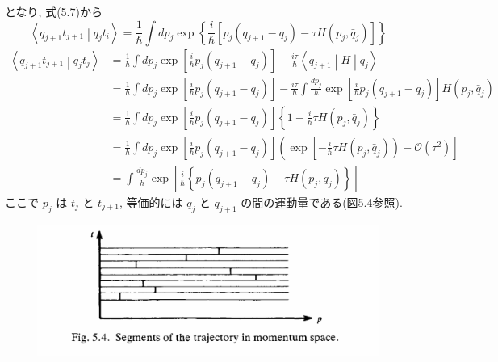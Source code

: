 \documentclass[a4paper,12pt]{article}
\newcommand{\braket}[2]{\left\langle #1\middle|#2\right\rangle}
\newcommand{\brakets}[3]{\left\langle #1\middle| #2 \middle|#3 \right\rangle}
\begin{document}
となり, 式(5.7)から
\begin{equation*}
    \braket{q_{j+1}t_{j+1}}{q_{j}t_{i}} = \frac{1}{\hbar}\int dp_{j} \exp\left\{ \frac{i}{\hbar}[p_{j}(q_{j+1} - q_{j}) - \tau H (p_{j}, \bar{q}_{j})] \right\} \tag{5.11}
\end{equation*}
\color{blue}
\begin{align*}
    \braket{q_{j+1}t_{j+1}}{q_{j}t_{j}} &= \frac{1}{h}\int dp_j \exp\left[ \frac{i}{\hbar}p_{j}(q_{j+1} - q_{j}) \right] - \frac{i\tau}{\hbar}\brakets{q_{j+1}}{H}{q_{j}}\\
    &= \frac{1}{h}\int dp_j \exp\left[ \frac{i}{\hbar}p_{j}(q_{j+1} - q_{j}) \right] - \frac{i\tau}{\hbar} \int \frac{dp_j}{h} \exp\left[ \frac{i}{\hbar}p_{j}(q_{j+1} - q_{j}) \right] H(p_{j}, \bar{q}_{j})\\
    &= \frac{1}{h}\int dp_j \exp\left[ \frac{i}{\hbar}p_{j}(q_{j+1} - q_{j}) \right] \left\{ 1 - \frac{i}{\hbar}\tau H(p_{j}, \bar{q}_{j}) \right\}\\
    &= \frac{1}{h}\int dp_{j} \exp\left[ \frac{i}{\hbar}p_{j}(q_{j+1} - q_{j}) \right] \left( \exp\left[ -\frac{i}{\hbar}\tau H(p_{j}, \bar{q}_{j}) \right) - \mathcal{O}(\tau^2) \right]\\
    &= \int \frac{dp_j}{h}\exp\left[ \frac{i}{\hbar}\left\{ p_j (q_{j+1} - q_j) - \tau H(p_j, \bar{q}_{j}) \right\} \right] \tag{5.11}
\end{align*}
\color{black}
ここで $p_j$ は $t_{j}$ と $t_{j+1}$, 等価的には $q_{j}$ と $q_{j+1}$ の間の運動量である(図5.4参照).

\begin{figure}[H]
    \centering
    \includegraphics[width=\textwidth]{figure/fig5-4.png}
\end{figure}
\end{document}
